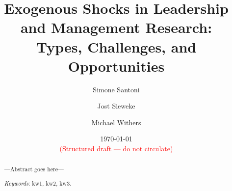 \usepackage{amssymb}

\usepackage[toc, page]{appendix}





\title{Exogenous Shocks in Leadership and Management Research:\\
Types, Challenges, and Opportunities\vspace{2em}}

\author[$\bullet$]{Simone Santoni}
\author[$\star$]{Jost Sieweke}
\author[$\circ$]{Michael Withers}

\renewcommand\Authands{and}
\renewcommand\Affilfont{\normalsize}

\date{\vspace{1em} \normalsize \today \vspace{1em} \\ 
      \textcolor{red}{(Structured draft --- do not circulate)}}



\begin{singlespace}

\maketitle

\begin{abstract}

---Abstract goes here---

\bigskip

\textit{Keywords}: kw1, kw2, kw3.

\end{abstract}

\end{singlespace}

